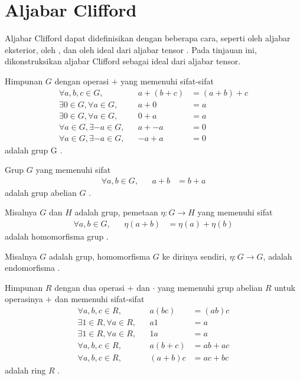 \section{Aljabar Clifford}

Aljabar Clifford dapat didefinisikan dengan beberapa cara, seperti oleh aljabar eksterior, oleh , dan oleh ideal dari aljabar tensor \citep{Lounesto2001}. Pada tinjauan ini, dikonstruksikan aljabar Clifford sebagai ideal dari aljabar tensor.

\begin{defn}[Grup]
Himpunan $G$ dengan operasi $+$ yang memenuhi sifat-sifat
\begingroup
\allowdisplaybreaks
\begin{align*}
    \forall a,b,c \in G,&& a + (b + c) &= (a + b) + c \\
    \exists 0 \in G, \forall a \in G,&& a + 0 &= a \\
    \exists 0 \in G, \forall a \in G,&& 0 + a &= a \\
    \forall a \in G, \exists {-a} \in G,&& a + {-a} &= 0 \\
    \forall a \in G, \exists {-a} \in G,&& {-a} + a &= 0
\end{align*}
\endgroup
adalah grup G \citep{Jacobson1995}.
\end{defn}

\begin{defn}
Grup $G$ yang memenuhi sifat
\begin{align*}
    \forall a,b \in G,&& a + b &= b + a
\end{align*}
adalah grup abelian $G$ \citep{Jacobson1995}.
\end{defn}

\begin{defn}
Misalnya $G$ dan $H$ adalah grup, pemetaan ${\eta: G \to H}$ yang memenuhi sifat
\begin{align*}
    \forall a,b \in G,&& \eta(a+b) &= \eta(a) + \eta(b)
\end{align*}
adalah homomorfisma grup \citep{Jacobson1995}.
\end{defn}

\begin{defn}[Endomorfisma]
Misalnya $G$ adalah grup, homomorfisma $G$ ke dirinya sendiri, ${\eta: G \to G}$, adalah endomorfisma \citep{Jacobson1995}.
\end{defn}

\begin{defn}[Ring]
Himpunan $R$ dengan dua operasi $+$ dan $\cdot$ yang memenuhi grup abelian $R$ untuk operasinya $+$ dan memenuhi sifat-sifat
\begingroup
\allowdisplaybreaks
\begin{align*}
    \forall a,b,c \in R,&& a(bc) &= (ab)c \\
    \exists 1 \in R, \forall a \in R,&& a1 &= a \\
    \exists 1 \in R, \forall a \in R,&& 1a &= a \\
    \forall a,b,c \in R,&& a(b+c) &= ab + ac \\
    \forall a,b,c \in R,&& (a+b)c &= ac + bc
\end{align*}
\endgroup
adalah ring $R$ \citep{Jacobson1995}.
\end{defn}

